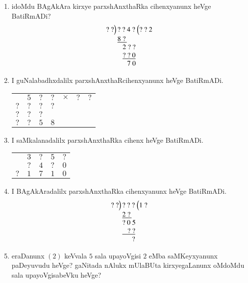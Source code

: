 \begin{enumerate}
\item idoMdu BAgAkAra kirxye parxshAnxthaRka cihenxyanunx heVge BatiRmADi?
$$
\begin{array}{r@{\,}l@{\,}l}
?~?\Big) &?~?~4~? & \Big(?~?~2\\
         & \underline{8~?\,} & \\
         & ~~~2~?~?\\
         & ~~~\underline{?~?~0}\\
         & ~\,~~~~7~0
\end{array}
$$

\item I guNalabadhxdalilx parxshAnxthaRcihenxyanunx heVge BatiRmADi.
\begin{center}
\begin{tabular}{ccccccc}
 & $5$ & $?$ & $?$ & $\times$ & $?$ & $?$\\
\cline{2-7}
$?$ & $?$ & $?$ & $?$ & & &\\
$?$ & $?$ & $?$ &  & & &\\
\cline{1-5}
$?$ & $?$ & $5$ & $8$ & & &
\end{tabular}
\end{center}

\item I saMkalanadalilx parxshAnxthaRka cihenx heVge BatiRmADi.
\begin{center}
\begin{tabular}{ccccc}
 & $3$ & $?$ & $5$ & $?$\\
 & $?$ & $4$ & $?$ & $0$\\
\cline{2-5}
$?$ & $1$ & $7$ & $1$ & $0$
\end{tabular}
\end{center}

\item I BAgAkAradalilx parxshAnxthaRka cihenxyanunx heVge BatiRmADi.
$$
\begin{array}{r@{\,}l@{\,}l}
?~?\Big) &?~?~? & \Big(1~?\\
         & \underline{2~?\,} & \\
         &?~0~5\\
         & \underline{~~~?~?}\\
         & ~\,~~~~?
\end{array}
$$

\item eraDanunx $(2)$ keVvala $5$ sala upayoVgisi $2$ eMba saMKeyxyanunx paDeyuvudu heVge? gaNitada nAlukx mUlaBUta kirxyegaLanunx oMdoMdu sala upayoVgisabeVku heVge?


\end{enumerate}
